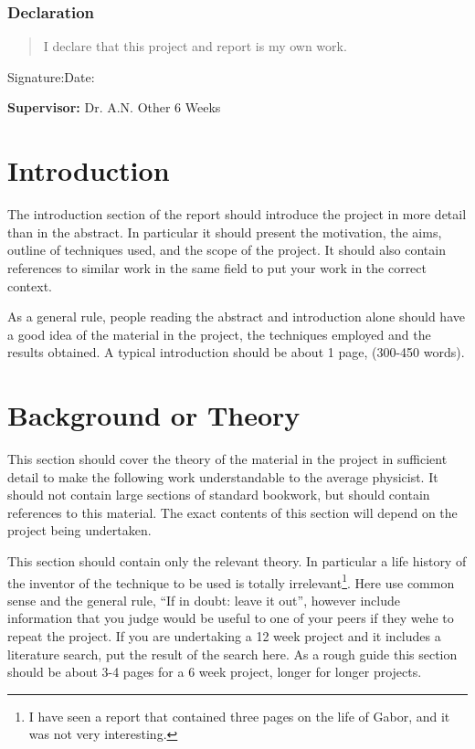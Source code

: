 \documentclass[a4paper,12pt]{article}
\begin{document}
\vspace*{1cm}

\subsubsection*{Declaration}

\begin{quotation}
        I declare that this project and report is my own work.
\end{quotation}

\vspace*{2cm}
Signature:\hspace*{8cm}Date:

\vfill
{\bf Supervisor:} Dr. A.N. Other                %
\hfill
6 Weeks                                         %
\newpage
%
\pagestyle{plain}                               %
\setcounter{page}{1}                            %
\tableofcontents                                %
\section{Introduction}

The introduction section of the report should introduce the project in
more detail than in the abstract. In particular it should present the
motivation, the aims, outline of techniques used, and the scope of the project. 
It should also contain references to similar work in the
same field to put your work in the correct context.

As a general rule, people reading the abstract and introduction alone
should have a good idea of the material in the project, the techniques
employed and the results obtained. A typical introduction should be
about 1 page, (300-450 words). 
\section{Background or Theory}

This section should cover the theory of the material in the project
in sufficient detail to make the following work understandable to the
average physicist. It should not contain large sections of standard
bookwork, but should contain references to this material. The exact
contents of this section will depend on the project being undertaken.

This section should contain only the
relevant theory. In particular a life history of the inventor of the
technique to be used is
totally irrelevant\footnote{I have seen a report that contained three pages
on the life of Gabor, and it was not very interesting.}. Here use common sense
and the general rule, ``If in doubt: leave it out'', however
include information that you judge would be useful to one of your
peers if they wehe to repeat the project. If you are
undertaking a 12 week project and it includes a literature search, put the
result of the search here. As a rough guide this section should be
about 3-4 pages for a 6 week project, longer for longer projects.
\end{document}
